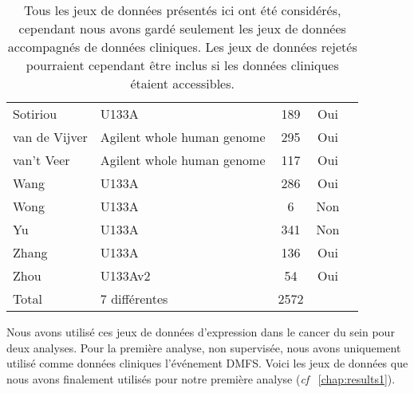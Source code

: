 \begin{table}
\begin{center}
\begin{tabular}{llccc}
						Sotiriou		& U133A								& 189	& Oui	\\
						van de Vijver	& Agilent whole human genome		& 295	& Oui	\\
						van't Veer		& Agilent whole human genome		& 117	& Oui	\\
						Wang			& U133A								& 286	& Oui	\\
						Wong			& U133A								& 6		& Non	\\
						Yu				& U133A								& 341	& Non	\\
						Zhang			& U133A								& 136	& Oui	\\
						Zhou			& U133Av2							& 54	& Oui	\\
						\midrule
						Total			& 7 différentes						& 2572	&		\\
						\bottomrule
					\end{tabular}
					\label{tab:MetDatasets}
					\vspace{5ex}
					\caption*{Tous les jeux de données présentés ici ont été considérés, cependant nous avons gardé seulement les jeux de données accompagnés de données cliniques. Les jeux de données rejetés pourraient cependant être inclus si les données cliniques étaient accessibles.}
				\end{center}
			\end{table}

			Nous avons utilisé ces jeux de données d'expression dans le cancer du sein pour deux analyses.
			Pour la première analyse, non supervisée, nous avons uniquement utilisé comme données cliniques l'événement DMFS.
			Voici les jeux de données que nous avons finalement utilisés pour notre première analyse (\emph{cf} ~\ref{chap:results1}).

